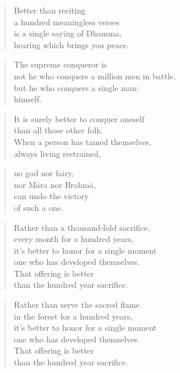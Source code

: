 \documentclass[12pt,openany]{book}%
\begin{document}
\begin{verse}%
Better than reciting \\
a hundred meaningless verses \\
is a single saying of Dhamma, \\
hearing which brings you peace. 

%
\end{verse}

\begin{verse}%
The supreme conqueror is \\
not he who conquers a million men in battle, \\
but he who conquers a single man: \\
himself. 

%
\end{verse}

\begin{verse}%
It is surely better to conquer oneself \\
than all those other folk. \\
When a person has tamed themselves, \\
always living restrained, 

%
\end{verse}

\begin{verse}%
no god nor fairy, \\
nor \textsanskrit{Māra} nor \textsanskrit{Brahmā}, \\
can undo the victory \\
of such a one. 

%
\end{verse}

\begin{verse}%
Rather than a thousand-fold sacrifice, \\
every month for a hundred years, \\
it’s better to honor for a single moment \\
one who has developed themselves. \\
That offering is better \\
than the hundred year sacrifice. 

%
\end{verse}

\begin{verse}%
Rather than serve the sacred flame \\
in the forest for a hundred years, \\
it’s better to honor for a single moment \\
one who has developed themselves. \\
That offering is better \\
than the hundred year sacrifice. 

%
\end{verse}
\end{document}
